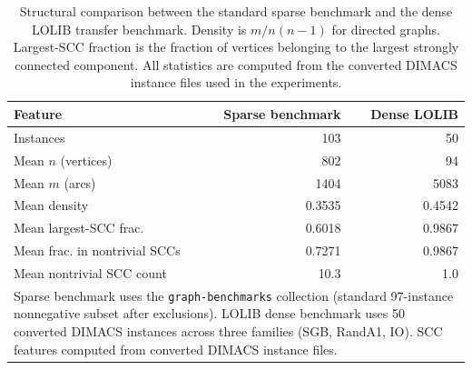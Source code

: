 \begin{table}[htbp]
\centering
\footnotesize
\caption{Structural comparison between the standard sparse benchmark and the
dense LOLIB transfer benchmark. Density is $m / n(n{-}1)$ for directed graphs.
Largest-SCC fraction is the fraction of vertices belonging to the largest
strongly connected component. All statistics are computed from the
converted DIMACS instance files used in the experiments.}
\label{tab:structural_diagnostic}
\begin{tabular}{lrr}
\toprule
Feature & Sparse benchmark & Dense LOLIB \\
\midrule
Instances & 103 & 50 \\
Mean $n$ (vertices) & 802 & 94 \\
Mean $m$ (arcs) & 1404 & 5083 \\
Mean density & 0.3535 & 0.4542 \\
Mean largest-SCC frac. & 0.6018 & 0.9867 \\
Mean frac. in nontrivial SCCs & 0.7271 & 0.9867 \\
Mean nontrivial SCC count & 10.3 & 1.0 \\
\bottomrule
\multicolumn{3}{p{0.9\linewidth}}{\footnotesize
Sparse benchmark uses the \texttt{graph-benchmarks} collection (standard 97-instance nonnegative subset after exclusions).
LOLIB dense benchmark uses 50 converted DIMACS instances across three families (SGB, RandA1, IO).
SCC features computed from converted DIMACS instance files.} \\
\end{tabular}
\end{table}
